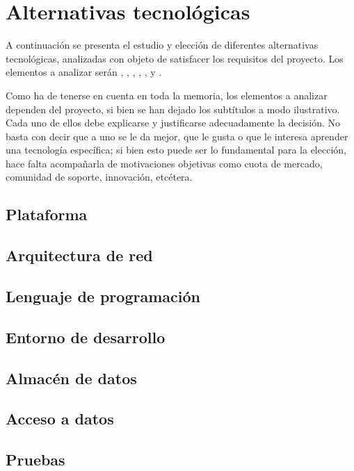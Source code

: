 \section{\forlnameref Alternativas tecnológicas}
\label{sec:technologicalChoices}

A continuación se presenta el estudio y elección de diferentes alternativas tecnológicas, analizadas con objeto de satisfacer los requisitos del proyecto. Los elementos a analizar serán , , , , ,  y .

\begin{shaded}
Como ha de tenerse en cuenta en toda la memoria, los elementos a analizar dependen del proyecto, si bien se han dejado los subtítulos a modo ilustrativo. Cada uno de ellos debe explicarse y justificarse adecuadamente la decisión. No basta con decir que a uno se le da mejor, que le gusta o que le interesa aprender una tecnología específica; si bien esto puede ser lo fundamental para la elección, hace falta acompañarla de motivaciones objetivas como cuota de mercado, comunidad de soporte, innovación, etcétera.
\end{shaded}

\subsection*{\forlnameref Plataforma}
\label{sec:platform}

\subsection*{\forlnameref Arquitectura de red}
\label{sec:netArchitecture}

\subsection*{\forlnameref Lenguaje de programación}
\label{sec:programmingLanguage}

\subsection*{\forlnameref Entorno de desarrollo}
\label{sec:framework}

\subsection*{\forlnameref Almacén de datos}
\label{sec:dataStorage}

\subsection*{\forlnameref Acceso a datos}
\label{sec:dataAccess}

\subsection*{\forlnameref Pruebas}
\label{sec:testing}